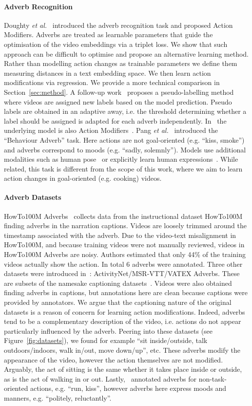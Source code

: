 \documentclass[10pt,twocolumn,letterpaper]{article}
\newcommand{\fparagraph}[1]{\paragraph{#1}}
\begin{document}
\fparagraph{Adverb Recognition} 
Doughty \textit{et al.}~\cite{doughty2020action} introduced the adverb recognition task and proposed Action Modifiers. Adverbs are treated as learnable parameters that guide the optimisation of the video embeddings via a triplet loss. 
We show that such approach can be difficult to optimise and propose an alternative learning method. 
Rather than modelling action changes as trainable parameters we define them measuring distances in a text embedding space. We then learn action modifications 
via regression. We provide a more technical comparison in Section~\ref{sec:method}.
A follow-up work~\cite{doughty2022you} 
proposes a pseudo-labelling method where videos are assigned new labels based on the model prediction. 
Pseudo labels are obtained in an adaptive away, i.e. the threshold determining whether a label should be assigned 
is adapted for each adverb independently. In~\cite{doughty2022you} the underlying model is also Action Modifiers~\cite{doughty2020action}. 
Pang \textit{et al.}~\cite{pang2018human, pang2020further} introduced the ``Behaviour Adverb'' task. Here actions are not goal-oriented (e.g. ``kiss, smoke'') and adverbs correspond to moods (e.g. ``sadly, solemnly''). 
Models use additional modalities such as human pose~\cite{pang2018human} or explicitly learn human expressions~\cite{pang2020further, fan2016video}. While related, this task is different from the scope of this work, where we aim to learn action changes in goal-oriented (e.g. cooking) videos. 

\vspace{-12pt}
\fparagraph{Adverb Datasets} 
HowTo100M Adverbs~\cite{doughty2020action} 
collects data from the instructional dataset HowTo100M~\cite{miech19howto100m} finding 
adverbs in the narration captions. Videos 
are loosely trimmed 
around the timestamp associated with the adverb. Due to the video-text misalignment in HowTo100M, and because training videos were not manually reviewed, 
videos in HowTo100M Adverbs are noisy. 
Authors estimated that only 44\% of the training videos actually show the action. 
In total 6 adverbs were annotated. 
Three other datasets were introduced in~\cite{doughty2022you}: ActivityNet/MSR-VTT/VATEX Adverbs. These are subsets of the namesake captioning datasets~\cite{krishna2017dense,xu2016msr,wang2019vatex}. 
Videos 
were also
obtained finding adverbs in captions, 
but annotations here are clean because captions were provided by annotators. 
We argue that the captioning nature of the original datasets is a reason of concern for learning action modifications. 
Indeed, 
adverbs tend to be a complementary description of the video, 
i.e. actions do not appear particularly influenced by the adverb. Peering into these datasets (see Figure~\ref{fig:datasets}), we found for example ``sit inside/outside, talk outdoors/indoors, 
walk in/out, move down/up'', etc. These adverbs modify the appearance of the video, however the action themselves are not modified. Arguably, the act of sitting is the same whether it takes place inside or outside, as is the act of 
walking in or out.
Lastly,~\cite{pang2018human, pang2020further} annotated adverbs for non-task-oriented actions, e.g. ``run, kiss'', however adverbs here express 
moods and manners, 
e.g. ``politely, 
reluctantly''. 
\end{document}
